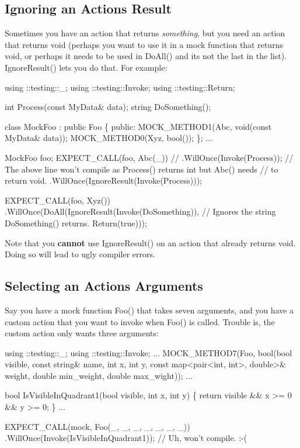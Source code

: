 \subsection*{Ignoring an Action\textquotesingle{}s Result}

Sometimes you have an action that returns {\itshape something}, but you need an action that returns {\ttfamily void} (perhaps you want to use it in a mock function that returns {\ttfamily void}, or perhaps it needs to be used in {\ttfamily Do\+All()} and it\textquotesingle{}s not the last in the list). {\ttfamily Ignore\+Result()} lets you do that. For example\+:


\begin{DoxyCode}
using ::testing::\_;
using ::testing::Invoke;
using ::testing::Return;

int Process(const MyData& data);
string DoSomething();

class MockFoo : public Foo \{
 public:
  MOCK\_METHOD1(Abc, void(const MyData& data));
  MOCK\_METHOD0(Xyz, bool());
\};
...

  MockFoo foo;
  EXPECT\_CALL(foo, Abc(\_))
  // .WillOnce(Invoke(Process));
  // The above line won't compile as Process() returns int but Abc() needs
  // to return void.
      .WillOnce(IgnoreResult(Invoke(Process)));

  EXPECT\_CALL(foo, Xyz())
      .WillOnce(DoAll(IgnoreResult(Invoke(DoSomething)),
      // Ignores the string DoSomething() returns.
                      Return(true)));
\end{DoxyCode}


Note that you {\bfseries cannot} use {\ttfamily Ignore\+Result()} on an action that already returns {\ttfamily void}. Doing so will lead to ugly compiler errors.

\subsection*{Selecting an Action\textquotesingle{}s Arguments}

Say you have a mock function {\ttfamily Foo()} that takes seven arguments, and you have a custom action that you want to invoke when {\ttfamily Foo()} is called. Trouble is, the custom action only wants three arguments\+:


\begin{DoxyCode}
using ::testing::\_;
using ::testing::Invoke;
...
  MOCK\_METHOD7(Foo, bool(bool visible, const string& name, int x, int y,
                         const map<pair<int, int>, double>& weight,
                         double min\_weight, double max\_wight));
...

bool IsVisibleInQuadrant1(bool visible, int x, int y) \{
  return visible && x >= 0 && y >= 0;
\}
...

  EXPECT\_CALL(mock, Foo(\_, \_, \_, \_, \_, \_, \_))
      .WillOnce(Invoke(IsVisibleInQuadrant1));  // Uh, won't compile. :-(
\end{DoxyCode}


